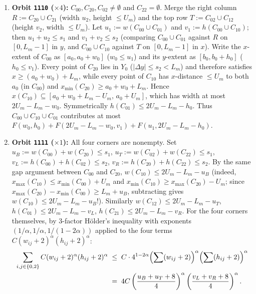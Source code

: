 \documentclass[11pt,reqno]{amsart}
\theoremstyle{plain}
\theoremstyle{definition}
\theoremstyle{remark}
\DeclareRobustCommand{\_}{\ifmmode\text{\textunderscore}\else\textunderscore\allowbreak\fi}
\begin{document}
\begin{enumerate}[label=(\arabic*),leftmargin=2em]
  \item \textbf{Orbit \texttt{1110} ($\times 4$):} $C_{00}, C_{20}, C_{02} \neq \emptyset$ and $C_{22} = \emptyset$. Merge the right column $R := C_{20} \cup C_{21}$ (width $u_2$, height $\le U_m$) and the top row $T := C_{02} \cup C_{12}$ (height $v_2$, width $\le U_m$). Let $u_1 := w(C_{00} \cup C_{01})$ and $v_1 := h(C_{00} \cup C_{10})$; then $u_1 + u_2 \le s_1$ and $v_1 + v_2 \le s_2$ (comparing $C_{00} \cup C_{01}$ against $R$ on $[0, L_m - 1]$ in $y$, and $C_{00} \cup C_{10}$ against $T$ on $[0, L_m - 1]$ in $x$). Write the $x$-extent of $C_{00}$ as $[a_0, a_0 + w_0]$ ($w_0 \le u_1$) and its $y$-extent as $[b_0, b_0 + h_0]$ ($h_0 \le v_1$). Every point of $C_{20}$ lies in $Y_0$ ($|\Delta y| \le s_2 < L_m$) and therefore satisfies $x \ge (a_0 + w_0) + L_m$, while every point of $C_{10}$ has $x$-distance $\le U_m$ to both $a_0$ (in $C_{00}$) and $x_{\min}(C_{20}) \ge a_0 + w_0 + L_m$. Hence $x(C_{10}) \subseteq [a_0 + w_0 + L_m - U_m,\, a_0 + U_m]$, which has width at most $2 U_m - L_m - w_0$. Symmetrically $h(C_{01}) \le 2 U_m - L_m - h_0$. Thus $C_{00} \cup C_{10} \cup C_{01}$ contributes at most $F(w_0, h_0) + F(2 U_m - L_m - w_0, v_1) + F(u_1, 2 U_m - L_m - h_0)$.
  \item \textbf{Orbit \texttt{1111} ($\times 1$):} All four corners are nonempty. Set $u_B := w(C_{00}) + w(C_{20}) \le s_1$, $u_T := w(C_{02}) + w(C_{22}) \le s_1$, $v_L := h(C_{00}) + h(C_{02}) \le s_2$, $v_R := h(C_{20}) + h(C_{22}) \le s_2$. By the same gap argument between $C_{00}$ and $C_{20}$, $w(C_{10}) \le 2 U_m - L_m - u_B$ (indeed, $x_{\max}(C_{10}) \le x_{\min}(C_{00}) + U_m$ and $x_{\min}(C_{10}) \ge x_{\max}(C_{20}) - U_m$; since $x_{\max}(C_{20}) - x_{\min}(C_{00}) \ge L_m + u_B$, subtracting gives $w(C_{10}) \le 2 U_m - L_m - u_B$!). Similarly $w(C_{12}) \le 2 U_m - L_m - u_T$, $h(C_{01}) \le 2 U_m - L_m - v_L$, $h(C_{21}) \le 2 U_m - L_m - v_R$. For the four corners themselves, by $3$-factor H\"older's inequality with exponents $(1/\alpha, 1/\alpha, 1/(1 - 2\alpha))$ applied to the four terms $C (w_{ij} + 2)^\alpha (h_{ij} + 2)^\alpha$:
  \begin{align}
    \sum_{i, j \in \{0, 2\}} C (w_{ij} + 2)^\alpha (h_{ij} + 2)^\alpha
    &\;\le\; C \cdot 4^{1 - 2\alpha} \Bigl(\sum (w_{ij} + 2)\Bigr)^\alpha \Bigl(\sum (h_{ij} + 2)\Bigr)^\alpha \notag\\
    &\;=\; 4 C \left(\frac{u_B + u_T + 8}{4}\right)^\alpha \left(\frac{v_L + v_R + 8}{4}\right)^\alpha. \label{eq:1111-holder}
  \end{align}

\end{enumerate}
\end{document}
